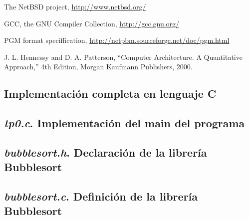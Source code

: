 \documentclass{article}
\begin{document}
\begin{thebibliography}{99}

	 The NetBSD project, \url{http://www.netbsd.org/}

	 GCC, the GNU Compiler Collection, \url{http://gcc.gnu.org/}

	 PGM format speciffication, \url{http://netpbm.sourceforge.net/doc/pgm.html}

	 J. L. Hennessy and D. A. Patterson, ``Computer Architecture. A Quantitative
	Approach,'' 4th Edition, Morgan Kaufmann Publishers, 2000.

	\end{thebibliography}

\newpage


\begin{appendices}

\bigskip\bigskip

\section{Implementación completa en lenguaje C}


\subsection{\textit{tp0.c}. Implementación del main del programa}
%  

\subsection{\textit{bubblesort.h}. Declaración de la librería Bubblesort}
%  

\subsection{\textit{bubblesort.c}. Definición de la librería Bubblesort}
%  


\end{appendices}
\end{document}
